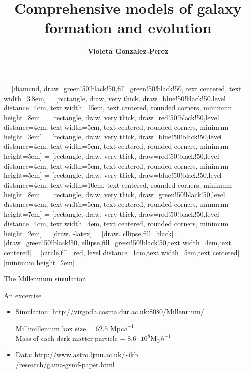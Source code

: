 \documentclass{beamer}
\title{Comprehensive models of galaxy formation and evolution}
\author{{\bf Violeta Gonzalez-Perez}}
\institute{@violegp\\
}
\date{}
\begin{document}



 = [diamond, draw=green!50!black!50,fill=green!50!black!50, text centered, text width=3.8em]
 = [rectangle, draw, very thick,
draw=blue!50!black!50,level distance=4cm,
    text width=15em, text centered, rounded corners, minimum height=8em]
 = [rectangle, draw, very thick,
draw=red!50!black!50,level distance=4cm,
    text width=5em, text centered, rounded corners, minimum height=3em]
 = [rectangle, draw, very thick,
draw=blue!50!black!50,level distance=4cm,
    text width=5em, text centered, rounded corners, minimum height=5em]
 = [rectangle, draw, very thick,
draw=red!50!black!50,level distance=4cm,
    text width=5em, text centered, rounded corners, minimum height=5em]
 = [rectangle, draw, very thick,
draw=blue!50!black!50,level distance=4cm,
    text width=10em, text centered, rounded corners, minimum height=8em]
 = [rectangle, draw, very thick,
draw=green!50!black!50,level distance=4cm,
    text width=5em, text centered, rounded corners, minimum height=7em]
 = [rectangle, draw, very thick,
draw=red!50!black!50,level distance=4cm,
    text width=4em, text centered, rounded corners, minimum height=2em]
 = [draw, -latex]
 = [draw, ellipse,fill=black]   
 = [draw=green!50!black!50, ellipse,fill=green!50!black!50,text width=4em,text centered]   
 = [circle,fill=red, level distance=1cm,text width=5em,text centered]   
 = [minimum height=2em]   



\begin{frame}{The Millennium simulation}
\begin{center}
\end{center}
\end{frame}

\begin{frame}{An excercise}
\begin{itemize}
\item Simulation: \url{http://virgodb.cosma.dur.ac.uk:8080/Millennium/}

Millimillenium box size = $62.5$ Mpc$h^{-1}$ \\
Mass of each dark matter particle = $8.6\cdot 10^8$M$_{\odot}h^{-1}$
\item Data: \url{http://www.astro.ljmu.ac.uk/~ikb} \\ \url{/research/gama-gsmf-paper.html}
\end{itemize}
\end{frame}
\end{document}

